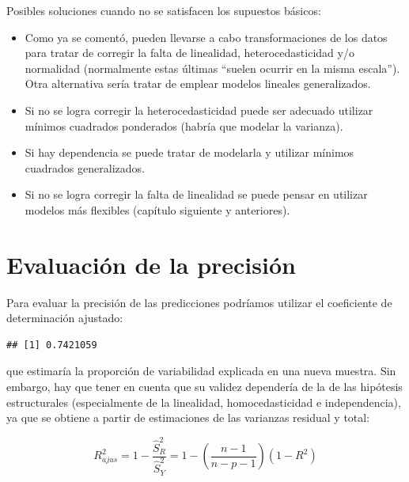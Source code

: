 \documentclass[
  spanish,
]{book}
\newenvironment{Shaded}{\begin{snugshade}}{\end{snugshade}}
\newcommand{\FunctionTok}[1]{\textcolor[rgb]{0.00,0.00,0.00}{#1}}
\newcommand{\NormalTok}[1]{#1}
\newcommand{\SpecialCharTok}[1]{\textcolor[rgb]{0.00,0.00,0.00}{#1}}
\theoremstyle{break}
\theoremstyle{definition}
\theoremstyle{definition}
\theoremstyle{definition}
\theoremstyle{definition}
\theoremstyle{remark}
\begin{document}
Posibles soluciones cuando no se satisfacen los supuestos básicos:

\begin{itemize}
\item
  Como ya se comentó, pueden llevarse a cabo transformaciones de los datos para tratar de
  corregir la falta de linealidad, heterocedasticidad y/o normalidad
  (normalmente estas últimas ``suelen ocurrir en la misma escala'').
  Otra alternativa sería tratar de emplear modelos lineales generalizados.
\item
  Si no se logra corregir la heterocedasticidad puede ser adecuado
  utilizar mínimos cuadrados ponderados (habría que modelar la varianza).
\item
  Si hay dependencia se puede tratar de modelarla y utilizar mínimos
  cuadrados generalizados.
\item
  Si no se logra corregir la falta de linealidad se puede pensar en
  utilizar modelos más flexibles (capítulo siguiente y anteriores).
\end{itemize}

\hypertarget{evaluaciuxf3n-de-la-precisiuxf3n}{%
\section{Evaluación de la precisión}\label{evaluaciuxf3n-de-la-precisiuxf3n}}

Para evaluar la precisión de las predicciones podríamos utilizar el coeficiente de determinación ajustado:

\begin{Shaded}
\end{Shaded}

\begin{verbatim}
## [1] 0.7421059
\end{verbatim}

que estimaría la proporción de variabilidad explicada en una nueva muestra.
Sin embargo, hay que tener en cuenta que su validez dependería de la de las hipótesis estructurales (especialmente de la linealidad, homocedasticidad e independencia), ya que se obtiene a partir de estimaciones de las varianzas residual y total:

\[R_{ajus}^{2} = 1 - \frac{\hat{S}_{R}^{2}}{\hat{S}_{Y}^{2}} 
= 1 - \left( \frac{n-1}{n-p-1} \right) (1-R^{2})\]
\end{document}
